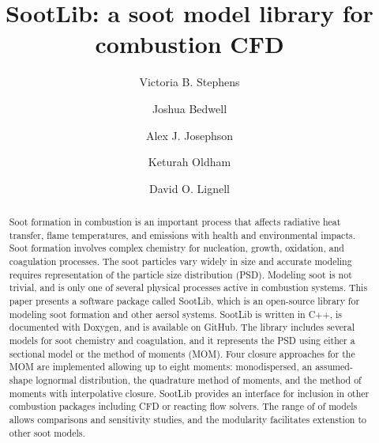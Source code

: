 \documentclass[preprint,letterpaper]{elsarticle}
\begin{document}
\begin{frontmatter}



\title{SootLib: a soot model library for combustion CFD}


\author{Victoria B. Stephens}
\author{Joshua Bedwell}
\author{Alex J. Josephson}
\author{Keturah Oldham}
\author{David O. Lignell}


\address{Chemical Engineering Department, Brigham Young University, Provo, UT 84602, USA}

\begin{abstract}
%
Soot formation in combustion is an important process that affects radiative heat transfer, flame temperatures, and emissions with health and environmental impacts. Soot formation involves complex chemistry for nucleation, growth, oxidation, and coagulation processes. The soot particles vary widely in size and accurate modeling requires representation of the particle size distribution (PSD). Modeling soot is not trivial, and is only one of several physical processes active in combustion systems. This paper presents a software package called SootLib, which is an open-source library for modeling soot formation and other aersol systems. SootLib is written in C++, is documented with Doxygen, and is available on GitHub. The library includes several models for soot chemistry and coagulation, and it represents the PSD using either a sectional model or the method of moments (MOM). Four closure approaches for the MOM are implemented allowing up to eight moments: monodispersed, an assumed-shape lognormal distribution, the quadrature method of moments, and the method of moments with interpolative closure. SootLib provides an interface for inclusion in other combustion packages including CFD or reacting flow solvers. The range of of models allows comparisons and sensitivity studies, and the modularity facilitates extenstion to other soot models.
%
\end{abstract}


\end{frontmatter}
\end{document}

